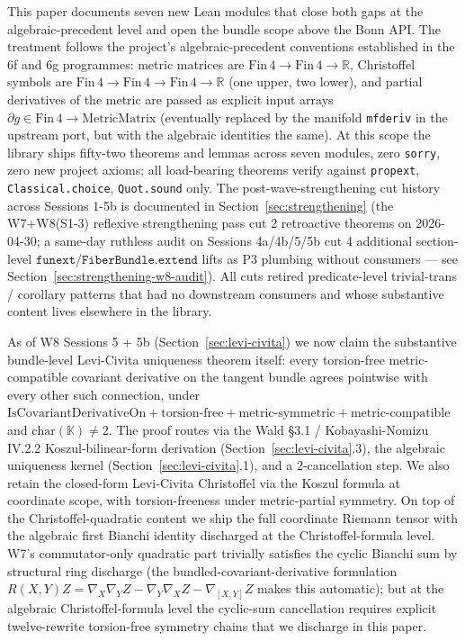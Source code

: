 \documentclass[twocolumn]{revtex4-2}
\begin{document}
This paper documents seven new Lean modules that close both gaps at
the algebraic-precedent level and open the bundle scope above the
Bonn API. The treatment follows the project's
algebraic-precedent conventions established in the 6f and 6g programmes:
metric matrices are $\mathrm{Fin}\,4 \to \mathrm{Fin}\,4 \to
\mathbb{R}$, Christoffel symbols are $\mathrm{Fin}\,4 \to \mathrm{Fin}\,4
\to \mathrm{Fin}\,4 \to \mathbb{R}$ (one upper, two lower), and partial
derivatives of the metric are passed as explicit input arrays
$\partial g \in \mathrm{Fin}\,4 \to \mathrm{MetricMatrix}$
(eventually replaced by the manifold \texttt{mfderiv} in the upstream
port, but with the algebraic identities the same). At this scope the
library ships fifty-two theorems and lemmas across seven modules,
zero \texttt{sorry}, zero new project axioms; all load-bearing
theorems verify against \texttt{propext}, \texttt{Classical.choice},
\texttt{Quot.sound} only. The post-wave-strengthening cut history
across Sessions 1-5b is documented in
Section~\ref{sec:strengthening} (the W7+W8(S1-3) reflexive
strengthening pass cut 2 retroactive theorems
on 2026-04-30; a same-day ruthless audit on Sessions 4a/4b/5/5b cut
4 additional section-level
$\texttt{funext}$/$\texttt{FiberBundle.extend}$ lifts as P3 plumbing
without consumers — see Section~\ref{sec:strengthening-w8-audit}).
All cuts retired predicate-level trivial-trans / corollary patterns
that had no downstream consumers and whose substantive content lives
elsewhere in the library.

As of W8 Sessions 5 + 5b (Section~\ref{sec:levi-civita}) we now
claim the substantive bundle-level Levi-Civita uniqueness theorem
itself: every torsion-free metric-compatible covariant derivative on
the tangent bundle agrees pointwise with every other such connection,
under $\mathrm{IsCovariantDerivativeOn} +
\mathrm{torsion\text{-}free} + \mathrm{metric\text{-}symmetric}
+ \mathrm{metric\text{-}compatible}$ and
$\mathrm{char}(\mathbb{K}) \neq 2$. The proof routes via the Wald
\S 3.1 / Kobayashi-Nomizu IV.2.2 Koszul-bilinear-form derivation
(Section~\ref{sec:levi-civita}.3), the algebraic uniqueness kernel
(Section~\ref{sec:levi-civita}.1), and a $2$-cancellation step. We
also retain the closed-form Levi-Civita Christoffel via the Koszul
formula at coordinate scope, with torsion-freeness under
metric-partial symmetry. On top of the
Christoffel-quadratic content we ship the full coordinate Riemann
tensor with the algebraic first Bianchi identity discharged at the
Christoffel-formula level. W7's commutator-only quadratic part
trivially satisfies the cyclic Bianchi sum by structural ring discharge
(the bundled-covariant-derivative formulation $R(X,Y)Z = \nabla_X\nabla_Y
Z - \nabla_Y\nabla_X Z - \nabla_{[X,Y]} Z$ makes this automatic); but
at the algebraic Christoffel-formula level the cyclic-sum cancellation
requires explicit twelve-rewrite torsion-free symmetry chains that we
discharge in this paper.
\end{document}
